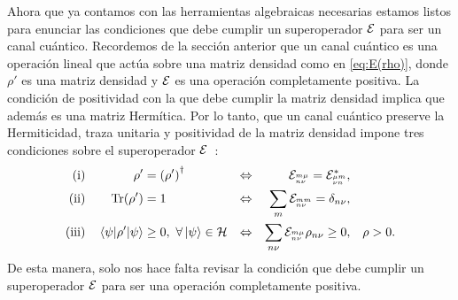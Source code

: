 Ahora que ya contamos con las herramientas algebraicas necesarias
estamos listos para enunciar las condiciones que debe cumplir un 
superoperador $\mathcal{E}$ para ser un canal cuántico. 
Recordemos de la sección anterior que un canal cuántico 
es una operación lineal que actúa sobre una matriz densidad 
como en \eqref{eq:E(rho)}, donde $\rho'$
es una matriz densidad y $\mathcal{E}$ es una operación completamente positiva.
La condición de positividad con la que debe cumplir la matriz densidad 
implica que además es una matriz Hermítica. 
Por lo tanto, que un canal cuántico preserve la Hermiticidad, traza unitaria 
y positividad de la matriz densidad impone tres condiciones 
sobre el superoperador $\mathcal{E}$~\cite{bengtsson_zyczkowski_2017}:
\begin{align}
\txt{(i)}&& \rho'&=\qty(\rho')^{\dagger}&\Leftrightarrow
    && \E_\ind{m\mu}{n\nu}=\E_\ind{\mu m}{\nu n}^*,&&
    \label{eq:H-condition}\\
\txt{(ii)}&&\Tr(\rho')&=1
    &\Leftrightarrow&&  \sum_{m}\E_\ind{mm}{n\nu}=\delta_{n\nu},&
    \label{eq:Tr-condition}\\     
\txt{(iii)}&&\matrixel{\psi}{\rho'}{\psi}&\geq0,\ \forall \ket{\psi} \in \hi
    &\Leftrightarrow&&  \sum_{n\nu}\E_{\ind{m\mu}{n\nu}}\rho_{n\nu}\geq0,& 
    & \rho>0.
    \label{eq:positivity-condition}
\end{align}
De esta manera, solo nos hace falta revisar la condición que debe cumplir
un superoperador $\mathcal{E}$ para ser una operación completamente positiva.

